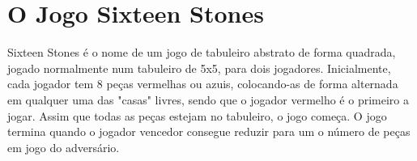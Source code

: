 \documentclass[a4paper]{article}
\begin{document}

\newpage

%
%
%
%
%
%
%


\section{O Jogo Sixteen Stones}


Sixteen Stones é o nome de um jogo de tabuleiro abstrato de forma quadrada, jogado normalmente num tabuleiro de 5x5, para dois jogadores. Inicialmente, cada jogador tem 8 peças vermelhas ou azuis, colocando-as de forma alternada em qualquer uma das "casas" livres, sendo que o jogador vermelho é o primeiro a jogar. Assim que todas as peças estejam no tabuleiro, o jogo começa. O jogo termina quando o jogador vencedor consegue reduzir para um o número de peças em jogo do adversário.
\end{document}
